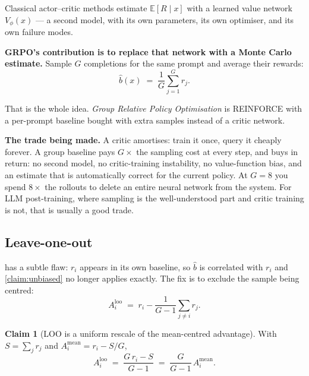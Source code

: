 \documentclass[11pt,letterpaper]{article}
\theoremstyle{definition}
\newtheorem{claim}{Claim}[section]
\newcommand{\E}{\mathbb{E}}
\newcommand{\Adv}{A}
\begin{document}
Classical actor--critic methods estimate $\E[R \mid x]$ with a learned value network $V_\phi(x)$ ---
a second model, with its own parameters, its own optimiser, and its own failure modes.

\textbf{GRPO's contribution is to replace that network with a Monte Carlo estimate.} Sample $G$
completions for the same prompt and average their rewards:
\begin{equation}
  \hat{b}(x) \;=\; \frac{1}{G}\sum_{j=1}^{G} r_j.
  \label{eq:groupmean}
\end{equation}

That is the whole idea. \emph{Group Relative Policy Optimisation} is REINFORCE with a per-prompt
baseline bought with extra samples instead of a critic network.

\begin{aside}
\textbf{The trade being made.} A critic amortises: train it once, query it cheaply forever. A group
baseline pays $G\times$ the sampling cost at every step, and buys in return: no second model, no
critic-training instability, no value-function bias, and an estimate that is automatically correct
for the current policy. At $G=8$ you spend $8\times$ the rollouts to delete an entire neural network
from the system. For LLM post-training, where sampling is the well-understood part and critic
training is not, that is usually a good trade.
\end{aside}

\subsection{Leave-one-out}

 has a subtle flaw: $r_i$ appears in its own baseline, so
$\hat{b}$ is correlated with $r_i$ and \cref{claim:unbiased} no longer applies exactly. The fix is to
exclude the sample being centred:
\begin{equation}
  \Adv_i^{\text{loo}} \;=\; r_i - \frac{1}{G-1}\sum_{j \neq i} r_j.
  \label{eq:loo}
\end{equation}

\begin{claim}[LOO is a uniform rescale of the mean-centred advantage]
\label{claim:loo}
With $S = \sum_j r_j$ and $\Adv_i^{\text{mean}} = r_i - S/G$,
\begin{equation}
  \Adv_i^{\text{loo}} \;=\; \frac{G\,r_i - S}{G-1} \;=\; \frac{G}{G-1}\,\Adv_i^{\text{mean}}.
\end{equation}
\end{claim}
\end{document}

